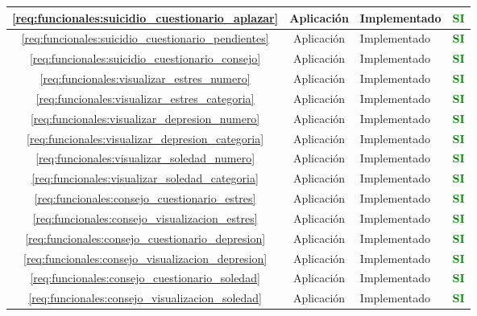 \begin{xltabular}{\textwidth}{|c|c|X|c|}
        \hline
        \ref{req:funcionales:suicidio_cuestionario_aplazar} & Aplicación & Implementado & \textcolor{green}{\textbf{SI}} \\
        \hline
        \ref{req:funcionales:suicidio_cuestionario_pendientes} & Aplicación & Implementado & \textcolor{green}{\textbf{SI}} \\
        \hline
        \ref{req:funcionales:suicidio_cuestionario_consejo} & Aplicación & Implementado & \textcolor{green}{\textbf{SI}} \\
        \hline
        \ref{req:funcionales:visualizar_estres_numero} & Aplicación & Implementado & \textcolor{green}{\textbf{SI}} \\
        \hline
        \ref{req:funcionales:visualizar_estres_categoria} & Aplicación & Implementado & \textcolor{green}{\textbf{SI}} \\
        \hline
        \ref{req:funcionales:visualizar_depresion_numero} & Aplicación & Implementado & \textcolor{green}{\textbf{SI}} \\
        \hline
        \ref{req:funcionales:visualizar_depresion_categoria} & Aplicación & Implementado & \textcolor{green}{\textbf{SI}} \\
        \hline
        \ref{req:funcionales:visualizar_soledad_numero} & Aplicación & Implementado & \textcolor{green}{\textbf{SI}} \\
        \hline
        \ref{req:funcionales:visualizar_soledad_categoria} & Aplicación & Implementado & \textcolor{green}{\textbf{SI}} \\
        \hline
        \ref{req:funcionales:consejo_cuestionario_estres} & Aplicación & Implementado & \textcolor{green}{\textbf{SI}} \\
        \hline
        \ref{req:funcionales:consejo_visualizacion_estres} & Aplicación & Implementado & \textcolor{green}{\textbf{SI}} \\
        \hline
        \ref{req:funcionales:consejo_cuestionario_depresion} & Aplicación & Implementado & \textcolor{green}{\textbf{SI}} \\
        \hline
        \ref{req:funcionales:consejo_visualizacion_depresion} & Aplicación & Implementado & \textcolor{green}{\textbf{SI}} \\
        \hline
        \ref{req:funcionales:consejo_cuestionario_soledad} & Aplicación & Implementado & \textcolor{green}{\textbf{SI}} \\
        \hline
        \ref{req:funcionales:consejo_visualizacion_soledad} & Aplicación & Implementado & \textcolor{green}{\textbf{SI}} \\

\end{xltabular}
